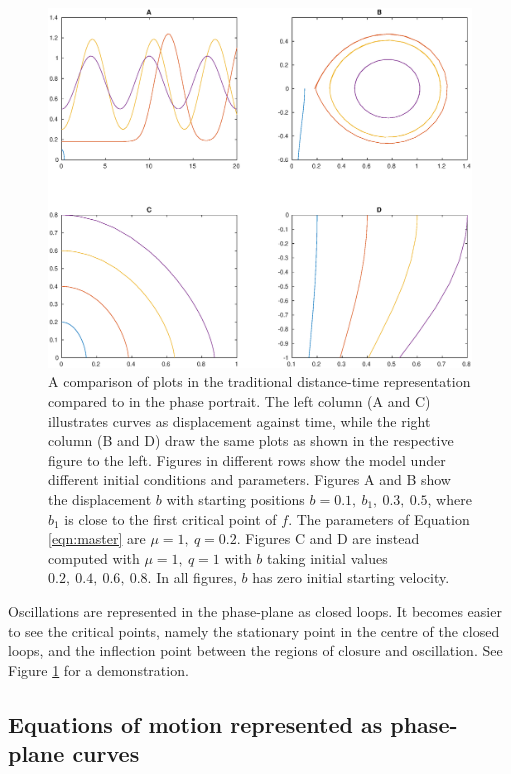 \documentclass{article}
\begin{document}
\begin{figure}
    \centering
    \includegraphics[width=\linewidth]{quadplot_phaseplane_versus_time_2}
    \caption{
        A comparison of plots in the traditional distance-time representation compared to in the phase portrait.
        The left column (A and C) illustrates curves as displacement against time, while the right column (B and D) draw the same plots as shown in the respective figure to the left.
        Figures in different rows show the model under different initial conditions and parameters.
        Figures A and B show the displacement $b$ with starting positions $b=0.1,~b_1,~0.3,~0.5$,
        where $b_1$ is close to the first critical point of $f$. The parameters of Equation \ref{eqn:master} are $\mu=1,~q=0.2$.
        Figures C and D are instead computed with $\mu=1,~q=1$ with $b$ taking initial values $0.2,~0.4,~0.6,~0.8$.
        In all figures, $b$ has zero initial starting velocity.
    }
    \label{fig:phaseportrait_compare}
\end{figure}
Oscillations are represented in the phase-plane as closed loops.
It becomes easier to see the critical points,
namely the stationary point in the centre of the closed loops,
and the inflection point between the regions of closure and oscillation.
See Figure \ref{fig:phaseportrait_compare} for a demonstration.

\subsection{Equations of motion represented as phase-plane curves}
\end{document}

